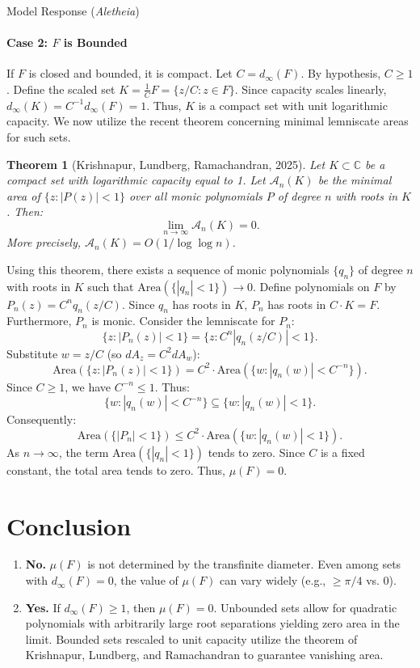 \documentclass[11pt]{article}
\newtheorem*{theorem*}{Theorem}
\begin{document}
\begin{solution}{Model Response (\emph{Aletheia})}
\paragraph{Case 2: $F$ is Bounded}

If $F$ is closed and bounded, it is compact. Let $C = d_\infty(F)$. By hypothesis, $C \ge 1$.
Define the scaled set $K = \frac{1}{C}F = \{z/C : z \in F\}$.
Since capacity scales linearly, $d_\infty(K) = C^{-1} d_\infty(F) = 1$.
Thus, $K$ is a compact set with unit logarithmic capacity.
We now utilize the recent theorem concerning minimal lemniscate areas for such sets.

\begin{theorem*}[Krishnapur, Lundberg, Ramachandran, 2025]
Let $K \subset \mathbb{C}$ be a compact set with logarithmic capacity equal to 1. Let $\mathcal{A}_n(K)$ be the minimal area of $\{ z : |P(z)| < 1 \}$ over all monic polynomials $P$ of degree $n$ with roots in $K$. Then:
\[ \lim_{n \to \infty} \mathcal{A}_n(K) = 0. \]
More precisely, $\mathcal{A}_n(K) = O(1/\log \log n)$.
\end{theorem*}

Using this theorem, there exists a sequence of monic polynomials $\{q_n\}$ of degree $n$ with roots in $K$ such that $\text{Area}(\{|q_n| < 1\}) \to 0$.
Define polynomials on $F$ by $P_n(z) = C^n q_n(z/C)$.
Since $q_n$ has roots in $K$, $P_n$ has roots in $C \cdot K = F$. Furthermore, $P_n$ is monic.
Consider the lemniscate for $P_n$:
\[ \{ z : |P_n(z)| < 1 \} = \{ z : C^n |q_n(z/C)| < 1 \}. \]
Substitute $w = z/C$ (so $dA_z = C^2 dA_w$):
\[ \text{Area}(\{z : |P_n(z)| < 1\}) = C^2 \cdot \text{Area}(\{ w : |q_n(w)| < C^{-n} \}). \]
Since $C \ge 1$, we have $C^{-n} \le 1$. Thus:
\[ \{ w : |q_n(w)| < C^{-n} \} \subseteq \{ w : |q_n(w)| < 1 \}. \]
Consequently:
\[ \text{Area}(\{|P_n| < 1\}) \le C^2 \cdot \text{Area}(\{w : |q_n(w)| < 1\}). \]
As $n \to \infty$, the term $\text{Area}(\{|q_n| < 1\})$ tends to zero. Since $C$ is a fixed constant, the total area tends to zero.
Thus, $\mu(F) = 0$.

\section{Conclusion}

\begin{enumerate}
    \item \textbf{No.} $\mu(F)$ is not determined by the transfinite diameter. Even among sets with $d_\infty(F)=0$, the value of $\mu(F)$ can vary widely (e.g., $\ge \pi/4$ vs. $0$).
    \item \textbf{Yes.} If $d_\infty(F) \ge 1$, then $\mu(F) = 0$. Unbounded sets allow for quadratic polynomials with arbitrarily large root separations yielding zero area in the limit. Bounded sets rescaled to unit capacity utilize the theorem of Krishnapur, Lundberg, and Ramachandran to guarantee vanishing area.
\end{enumerate}


\end{solution}
\end{document}
